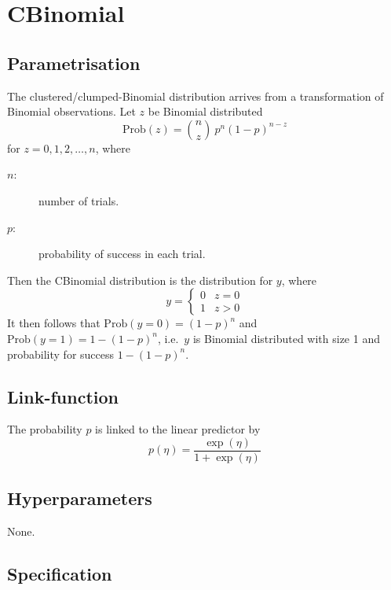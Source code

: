 \documentclass[a4paper,11pt]{article}
\begin{document}
\section*{CBinomial}

\subsection*{Parametrisation}

The clustered/clumped-Binomial distribution arrives from a
transformation of Binomial observations. Let $z$ be Binomial distributed
\begin{displaymath}
    \text{Prob}(z) = {n \choose z} \ p^n (1-p)^{n-z}
\end{displaymath}
for $z=0, 1, 2, \ldots,n$, where
\begin{description}
\item[$n$:] number of trials.
\item[$p$:] probability of success in each trial.
\end{description}
Then the CBinomial distribution is the distribution for $y$, where
\begin{displaymath}
    y =
    \begin{cases}
        0 & z = 0\\
        1 & \text{$z > 0$}
    \end{cases}
\end{displaymath}
It then follows that $\text{Prob}(y = 0) = (1-p)^{n}$ and
$\text{Prob}(y=1) = 1-(1-p)^{n}$, i.e.\ $y$ is Binomial distributed
with size 1 and probability for success $1-(1-p)^{n}$.

\subsection*{Link-function}

The probability $p$ is linked to the linear predictor by
\begin{displaymath}
    p(\eta) = \frac{\exp(\eta)}{1+\exp(\eta)}
\end{displaymath}

\subsection*{Hyperparameters}

None.

\subsection*{Specification}
\end{document}
